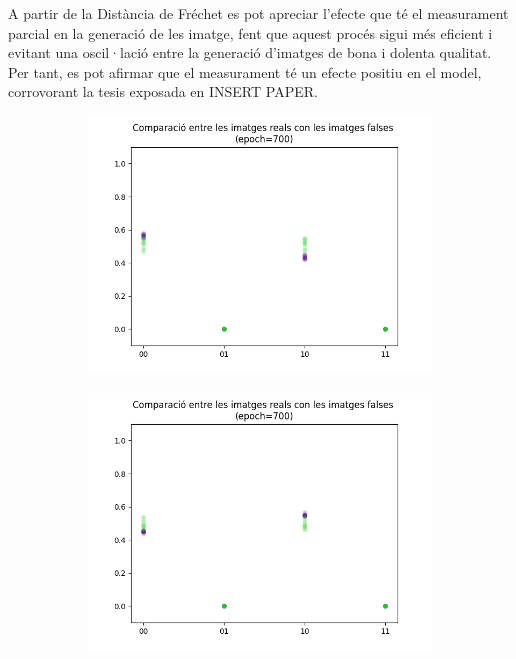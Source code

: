 A partir de la Distància de Fréchet es pot apreciar l'efecte que té el measurament parcial en la generació de les imatge, fent que aquest procés sigui més eficient i evitant una oscil·lació entre la generació d'imatges de bona i dolenta qualitat. Per tant, es pot afirmar que el measurament té un efecte positiu en el model, corrovorant la tesis exposada en INSERT PAPER.

\begin{figure}[H]
	\begin{subfigure}[b]{.32\linewidth}
		\includegraphics[width=\linewidth]{figures/data/scatter_plot_4.png}
		\caption{}
	\end{subfigure}
	\begin{subfigure}[b]{.32\linewidth}
		\includegraphics[width=\linewidth]{figures/data/scatter_plot_5.png}

\end{subfigure}
\end{figure}
